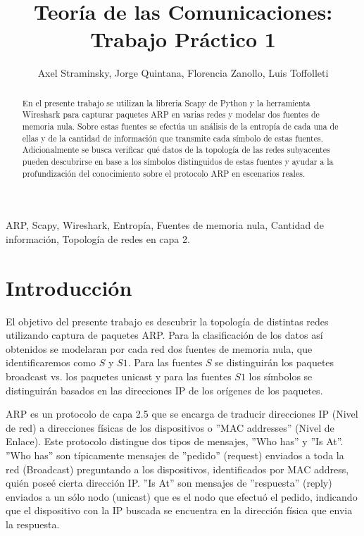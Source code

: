 \documentclass[letterpaper, 10 pt, conference]{ieeeconf}  %
\title{\LARGE \bf
Teoría de las Comunicaciones: Trabajo Práctico 1
}
\author{Axel Straminsky, Jorge Quintana, Florencia Zanollo, Luis Toffolleti}%
\begin{document}
\maketitle
\thispagestyle{empty}
\pagestyle{empty}


\begin{abstract}
En el presente trabajo se utilizan la libreria Scapy de Python y la herramienta Wireshark para capturar paquetes ARP en varias redes y modelar dos fuentes de memoria nula. Sobre estas fuentes se efectúa un análisis de la entropía de cada una de ellas y de la cantidad de información que transmite cada símbolo de estas fuentes. Adicionalmente se busca verificar qué datos de la topología de las redes subyacentes pueden descubrirse en base a los símbolos distinguidos de estas fuentes y ayudar a la profundización del conocimiento sobre el protocolo ARP en escenarios reales.
\end{abstract}
\begin{keywords}
ARP, Scapy, Wireshark, Entropía, Fuentes de memoria nula, Cantidad de información, Topología de redes en capa 2.
\end{keywords}

\section{Introducción}


El objetivo del presente trabajo es descubrir la topología de distintas redes utilizando captura de paquetes ARP. Para la clasificación de los datos así obtenidos se modelaran por cada red dos fuentes de memoria nula, que identificaremos como $S$ y $S1$. Para las fuentes $S$ se distinguirán los paquetes broadcast vs. los paquetes unicast y para las fuentes $S1$ los símbolos se distinguirán basados en las direcciones IP de los orígenes de los paquetes.

ARP es un protocolo de capa 2.5 que se encarga de traducir direcciones IP (Nivel de red) a direcciones físicas de los dispositivos o ''MAC addresses'' (Nivel de Enlace). Este protocolo distingue dos tipos de mensajes, ''Who has'' y ''Is At''.
''Who has'' son típicamente mensajes de ''pedido'' (request) enviados a toda la red (Broadcast) preguntando a los dispositivos, identificados por MAC address, quién poseé cierta dirección IP.
''Is At'' son mensajes de ''respuesta'' (reply) enviados a un sólo nodo (unicast) que es el nodo que efectuó el pedido, indicando que el dispositivo con la IP buscada se encuentra en la dirección física que envia la respuesta.
\end{document}
